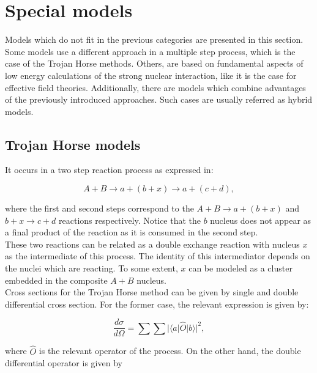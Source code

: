 \documentclass[openany]{book}
\begin{document}
\section{Special models} \label{sec:specialModels}

Models which do not fit in the previous categories are presented in this section. Some models use a different approach in a multiple step process, which is the case of the Trojan Horse methods. Others, are based on fundamental aspects of low energy calculations of the strong nuclear interaction, like it is the case for effective field theories. Additionally, there are models which combine advantages of the previously introduced approaches. Such cases are usually referred as hybrid models.

\subsection{Trojan Horse models} \label{sub:special_trojanHorse}

It occurs in a two step reaction process as expressed in:

\begin{equation}\label{eq: special_trojanHorse_reaction}
	A + B \rightarrow a + (b + x)\rightarrow a + (c + d),
\end{equation}

where the first and second steps correspond to the $A + B \rightarrow a + (b + x)$ and $b + x \rightarrow c + d$ reactions respectively. Notice that the $b$ nucleus does not appear as a final product of the reaction as it is consumed in the second step. \\

These two reactions can be related as a double exchange reaction with nucleus $x$ as the intermediate of this process. The identity of this intermediator depends on the nuclei which are reacting. To some extent, $x$ can be modeled as a cluster embedded in the composite $A + B$ nucleus. \\ 

Cross sections for the Trojan Horse method can be given by single and double differential cross section. For the former case, the relevant expression is given by: 

\begin{equation}\label{eq: special_differential_single}
	\frac{d\sigma}{d\Omega} = \sum \sum |\langle a | \hat O | b  \rangle|^2,
\end{equation}

where $\hat O$ is the relevant operator of the process. On the other hand, the double differential operator is given by 
\end{document}
